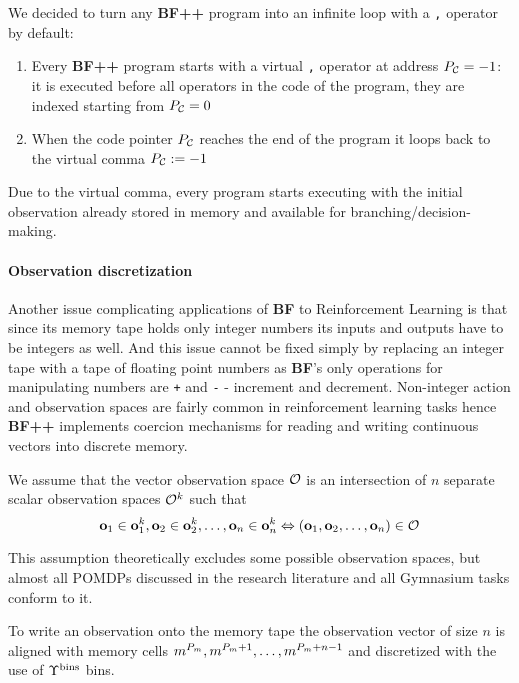We decided to turn any \textbf{BF++} program into an infinite loop with a \texttt{,} operator by default:
\begin{enumerate}
    \item Every \textbf{BF++} program starts with a virtual \texttt{,} operator at address $P_{\mathcal{C}} = -1$: it is executed before all operators in the code of the program, they are indexed starting from $P_{\mathcal{C}} = 0$
    \item When the code pointer $P_{\mathcal{C}}$ reaches the end of the program it loops back to the virtual comma $P_{\mathcal{C}} := -1$
\end{enumerate}

Due to the virtual comma, every program starts executing with the initial observation already stored in memory and available for branching/decision-making.

\paragraph{Observation discretization}
\label{sec:observe}

Another issue complicating applications of \textbf{BF} to Reinforcement Learning is that since its memory tape holds only integer numbers its inputs and outputs have to be integers as well.
And this issue cannot be fixed simply by replacing an integer tape with a tape of floating point numbers as \textbf{BF}'s only operations for manipulating numbers are \texttt{+} and \texttt{-} - increment and decrement.
Non-integer action and observation spaces are fairly common in reinforcement learning tasks hence \textbf{BF++} implements coercion mechanisms for reading and writing continuous vectors into discrete memory.

We assume that the vector observation space $\mathcal{O}$ is an intersection of $n$ separate scalar observation spaces $\mathcal{O}^k$ such that 
\begin{equation}
 \mathbf{o}_1 \in \mathbf{o}_1^k,\mathbf{o}_2 \in \mathbf{o}_2^k,\dots,\mathbf{o}_n \in \mathbf{o}_n^k \Leftrightarrow (\mathbf{o}_1,\mathbf{o}_2,\dots,\mathbf{o}_n) \in \mathcal{O}  
\end{equation}

This assumption theoretically excludes some possible observation spaces, but almost all POMDPs discussed in the research literature and all Gymnasium tasks conform to it.

To write an observation onto the memory tape the observation vector of size $n$ is aligned with memory cells $m^{P_m},m^{P_m+1},\dots,m^{P_m+n-1}$ and discretized with the use of $\Upsilon^\text{bins}$ bins.


